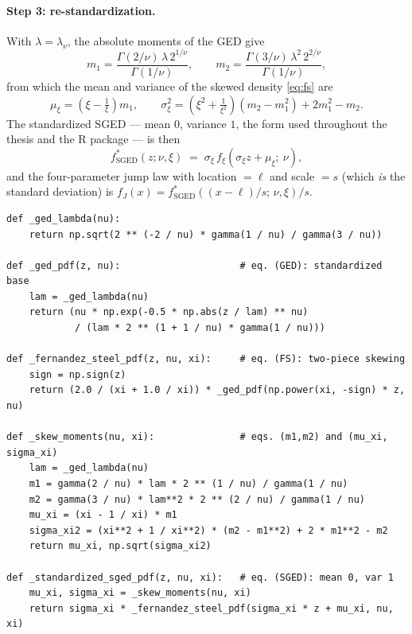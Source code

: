 \paragraph{Step 3: re-standardization.}
With $\lambda = \lambda_\nu$, the absolute moments of the GED give
\begin{equation}
  m_1 = \frac{\Gamma(2/\nu)\,\lambda\, 2^{1/\nu}}{\Gamma(1/\nu)},
  \qquad
  m_2 = \frac{\Gamma(3/\nu)\,\lambda^2\, 2^{2/\nu}}{\Gamma(1/\nu)},
  \label{eq:sged-moments}
\end{equation}
from which the mean and variance of the skewed density \eqref{eq:fs} are
\begin{equation}
  \mu_\xi = \left(\xi - \tfrac{1}{\xi}\right) m_1,
  \qquad
  \sigma_\xi^2
  = \left(\xi^2 + \tfrac{1}{\xi^2}\right)\left(m_2 - m_1^2\right)
    + 2 m_1^2 - m_2 .
  \label{eq:sged-muxi}
\end{equation}
The standardized SGED --- mean $0$, variance $1$, the form used throughout
the thesis and the  R package --- is then
\begin{equation}
  f^{\ast}_{\mathrm{SGED}}(z; \nu, \xi)
  \;=\;
  \sigma_\xi\, f_{\xi}\!\left( \sigma_\xi z + \mu_\xi ;\ \nu \right),
  \label{eq:sged-std}
\end{equation}
and the four-parameter jump law with location  $= \ell$
and scale  $= s$ (which \emph{is} the standard
deviation) is $f_J(x) = f^{\ast}_{\mathrm{SGED}}((x - \ell)/s;\, \nu, \xi)/s$.

\begin{lstlisting}[caption={The three-step SGED construction in \code{distributions/sged.py}.}]
def _ged_lambda(nu):
    return np.sqrt(2 ** (-2 / nu) * gamma(1 / nu) / gamma(3 / nu))

def _ged_pdf(z, nu):                     # eq. (GED): standardized base
    lam = _ged_lambda(nu)
    return (nu * np.exp(-0.5 * np.abs(z / lam) ** nu)
            / (lam * 2 ** (1 + 1 / nu) * gamma(1 / nu)))

def _fernandez_steel_pdf(z, nu, xi):     # eq. (FS): two-piece skewing
    sign = np.sign(z)
    return (2.0 / (xi + 1.0 / xi)) * _ged_pdf(np.power(xi, -sign) * z, nu)

def _skew_moments(nu, xi):               # eqs. (m1,m2) and (mu_xi, sigma_xi)
    lam = _ged_lambda(nu)
    m1 = gamma(2 / nu) * lam * 2 ** (1 / nu) / gamma(1 / nu)
    m2 = gamma(3 / nu) * lam**2 * 2 ** (2 / nu) / gamma(1 / nu)
    mu_xi = (xi - 1 / xi) * m1
    sigma_xi2 = (xi**2 + 1 / xi**2) * (m2 - m1**2) + 2 * m1**2 - m2
    return mu_xi, np.sqrt(sigma_xi2)

def _standardized_sged_pdf(z, nu, xi):   # eq. (SGED): mean 0, var 1
    mu_xi, sigma_xi = _skew_moments(nu, xi)
    return sigma_xi * _fernandez_steel_pdf(sigma_xi * z + mu_xi, nu, xi)
\end{lstlisting}


